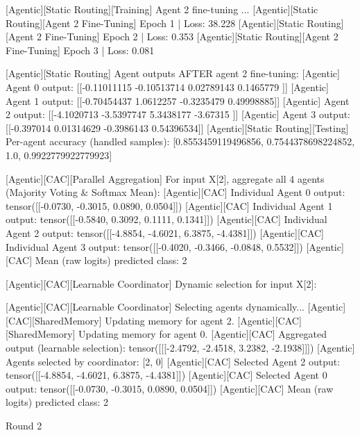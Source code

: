 [Agentic][Static Routing][Training] Agent 2 fine-tuning ...
[Agentic][Static Routing][Agent 2 Fine-Tuning] Epoch 1 | Loss: 38.228
[Agentic][Static Routing][Agent 2 Fine-Tuning] Epoch 2 | Loss: 0.353
[Agentic][Static Routing][Agent 2 Fine-Tuning] Epoch 3 | Loss: 0.081

[Agentic][Static Routing] Agent outputs AFTER agent 2 fine-tuning:
[Agentic] Agent 0 output: [[-0.11011115 -0.10513714  0.02789143  0.1465779 ]]
[Agentic] Agent 1 output: [[-0.70454437  1.0612257  -0.3235479   0.49998885]]
[Agentic] Agent 2 output: [[-4.1020713 -3.5397747  5.3438177 -3.67315  ]]
[Agentic] Agent 3 output: [[-0.397014    0.01314629 -0.3986143   0.54396534]]
[Agentic][Static Routing][Testing] Per-agent accuracy (handled samples): [0.8553459119496856, 0.7544378698224852, 1.0, 0.9922779922779923]

[Agentic][CAC][Parallel Aggregation] For input X[2], aggregate all 4 agents (Majority Voting & Softmax Mean):
[Agentic][CAC] Individual Agent 0 output: tensor([[-0.0730, -0.3015,  0.0890,  0.0504]])
[Agentic][CAC] Individual Agent 1 output: tensor([[-0.5840,  0.3092,  0.1111,  0.1341]])
[Agentic][CAC] Individual Agent 2 output: tensor([[-4.8854, -4.6021,  6.3875, -4.4381]])
[Agentic][CAC] Individual Agent 3 output: tensor([[-0.4020, -0.3466, -0.0848,  0.5532]])
[Agentic][CAC] Mean (raw logits) predicted class: 2

[Agentic][CAC][Learnable Coordinator] Dynamic selection for input X[2]:

[Agentic][CAC][Learnable Coordinator] Selecting agents dynamically...
[Agentic][CAC][SharedMemory] Updating memory for agent 2.
[Agentic][CAC][SharedMemory] Updating memory for agent 0.
[Agentic][CAC] Aggregated output (learnable selection): tensor([[[-2.4792, -2.4518,  3.2382, -2.1938]]])
[Agentic] Agents selected by coordinator: [2, 0]
[Agentic][CAC] Selected Agent 2 output: tensor([[-4.8854, -4.6021,  6.3875, -4.4381]])
[Agentic][CAC] Selected Agent 0 output: tensor([[-0.0730, -0.3015,  0.0890,  0.0504]])
[Agentic][CAC] Mean (raw logits) predicted class: 2

Round 2

